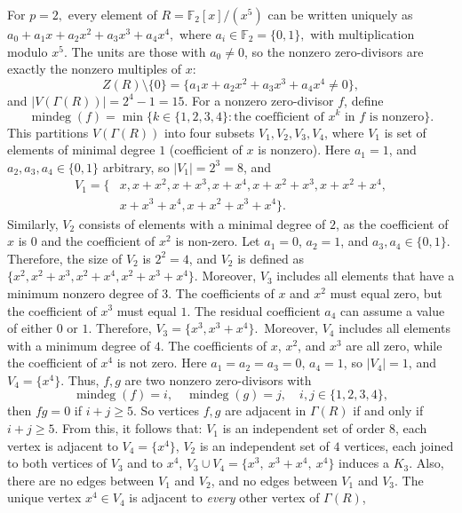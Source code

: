 \documentclass[12pt,twoside]{article}
\begin{document}
For $p=2,$   every element of $R=\mathbb{F}_2[x]/(x^5)$ can be written uniquely as $a_0 + a_1x + a_2x^2 + a_3x^3 + a_4x^4,$ where $a_i\in\mathbb{F}_2=\{0,1\},$ with multiplication modulo $x^5$. The units are those with $a_0\neq 0$, so the nonzero zero-divisors are exactly the nonzero
multiples of $x$:
\[
Z(R)\setminus\{0\} = \{a_1x + a_2x^2 + a_3x^3 + a_4x^4 \neq 0\},
\]
and $|V( \varGamma(R))| = 2^4 - 1 = 15.$ For a nonzero zero-divisor $f$, define
\[
\operatorname{mindeg}(f)
= \min\{k\in\{1,2,3,4\} : \text{the coefficient of }x^k\text{ in }f\text{ is nonzero}\}.
\]
This partitions $V( \varGamma(R))$ into four subsets $V_1,V_2,V_3,V_4$, where $V_1$ is set of elements of minimal degree $1$ (coefficient of $x$ is nonzero). Here $a_1=1$, and $a_2,a_3,a_4\in\{0,1\}$ arbitrary, so $|V_1|=2^3=8$, and 
	\[
	\begin{aligned}
		V_1 = \{&
		x,
		x+x^2,
		x+x^3,
		x+x^4,
		x+x^2+x^3,
		x+x^2+x^4,\\
		&x+x^3+x^4,
		x+x^2+x^3+x^4
		\}.
	\end{aligned}
	\]
	Similarly, $V_2$ consists of elements with a minimal degree of $2$, as the coefficient of $x$ is $0$ and the coefficient of $x^2$ is non-zero. Let $a_1=0$, $a_2=1$, and $a_3,a_4\in\{0,1\}$. 
	Therefore, the size of \(V_2\) is \(2^2=4\), and \(V_2\) is defined as \(\{x^2, x^2+x^3, x^2+x^4, x^2+x^3+x^4\}\).
	Moreover, \(V_3\) includes all elements that have a minimum nonzero degree of \(3\).
	The coefficients of \(x\) and \(x^2\) must equal zero, but the coefficient of \(x^3\) must equal \(1\). The residual coefficient \(a_4\) can assume a value of either \(0\) or \(1\). Therefore, $V_3=\{x^3, x^3+x^4\}$. Moreover, \(V_4\) includes all elements with a minimum degree of \(4\). The coefficients of \(x\), \(x^2\), and \(x^3\) are all zero, while the coefficient of \(x^4\) is not zero.
	 Here $a_1=a_2=a_3=0$, $a_4=1$, so $|V_4|=1$, and 	$V_4 = \{x^4\}.$  Thus, $f,g$ are two nonzero zero-divisors with 
\[
\operatorname{mindeg}(f) = i,\quad \operatorname{mindeg}(g) = j,\quad i,j\in\{1,2,3,4\},
\]
then $fg=0  $ if $ i+j \ge 5.$
So vertices $f,g$ are adjacent in $ \varGamma(R)$ if and only if $i+j\ge 5$. From this, it follows that: $V_1$ is an independent set of order $8$, each vertex is  adjacent to $V_{4}=\{x^4\}$,  $V_2$ is an independent set of $4$ vertices, each joined to both vertices of $V_3$
	and to $x^4$, $V_3\cup V_4 = \{x^3,\ x^3+x^4,\ x^4\}$ induces a $K_3$. Also, there are no edges between $V_1$ and $V_2$, and no edges between $V_1$ and $V_3$.  The unique vertex $x^4\in V_4$ is adjacent to \emph{every} other vertex of $ \varGamma(R)$,
\end{document}
